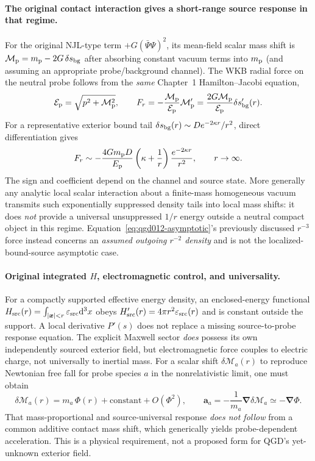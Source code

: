 \documentclass[11pt,a4paper]{article}
\newcommand{\dd}{\mathrm d}
\begin{document}
\paragraph{The original contact interaction gives a short-range source response in that regime.}
For the original NJL-type term $+G(\bar\Psi\Psi)^2$, its mean-field scalar mass shift is $\mathcal M_{\rm p}=m_{\rm p}-2G\,\delta s_{\rm bg}$ after absorbing constant vacuum terms into $m_{\rm p}$ (and assuming an appropriate probe/background channel). The WKB radial force on the neutral probe follows from the \emph{same} Chapter~1 Hamilton--Jacobi equation,
\begin{equation}\label{eq:qgd013-force}
 \mathcal E_{\rm p}=\sqrt{p^2+\mathcal M_{\rm p}^2},\qquad
 F_r=-\frac{\mathcal M_{\rm p}}{\mathcal E_{\rm p}}\mathcal M_{\rm p}'
 =\frac{2G\mathcal M_{\rm p}}{\mathcal E_{\rm p}}\delta s_{\rm bg}'(r).
\end{equation}
For a representative exterior bound tail $\delta s_{\rm bg}(r)\sim D e^{-2\kappa r}/r^2$, direct differentiation gives
\begin{equation}\label{eq:qgd013-tail-force}
 F_r\sim-\frac{4Gm_{\rm p}D}{E_{\rm p}}\left(\kappa+\frac1r\right)
 \frac{e^{-2\kappa r}}{r^2},\qquad r\to\infty.
\end{equation}
The sign and coefficient depend on the channel and source state. More generally any analytic local scalar interaction about a finite-mass homogeneous vacuum transmits such exponentially suppressed density tails into local mass shifts: it does \emph{not} provide a universal unsuppressed $1/r$ energy outside a neutral compact object in this regime. Equation~\eqref{eq:qgd012-asymptotic}'s previously discussed $r^{-3}$ force instead concerns an \emph{assumed outgoing $r^{-2}$ density} and is not the localized-bound-source asymptotic case.

\paragraph{Original integrated $H$, electromagnetic control, and universality.}
For a compactly supported effective energy density, an enclosed-energy functional $H_{\rm src}(r)=\int_{|\bm x|<r}\varepsilon_{\rm src}\dd^3x$ obeys $H'_{\rm src}(r)=4\pi r^2\varepsilon_{\rm src}(r)$ and is constant outside the support. A local derivative $P'(s)$ does not replace a missing source-to-probe response equation. The explicit Maxwell sector \emph{does} possess its own independently sourced exterior field, but electromagnetic force couples to electric charge, not universally to inertial mass. For a scalar shift $\delta\mathcal M_a(r)$ to reproduce Newtonian free fall for probe species $a$ in the nonrelativistic limit, one must obtain
\begin{equation}\label{eq:qgd013-universality}
 \delta\mathcal M_a(r)=m_a\,\Phi(r)+\mathrm{constant}+O(\Phi^2),\qquad
 \bm a_a=-\frac{1}{m_a}\bm\nabla\delta\mathcal M_a\simeq-\bm\nabla\Phi.
\end{equation}
That mass-proportional and source-universal response \emph{does not follow} from a common additive contact mass shift, which generically yields probe-dependent acceleration. This is a physical requirement, not a proposed form for QGD's yet-unknown exterior field.
\end{document}
